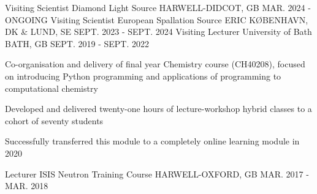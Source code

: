 \begin{cventries}
	\cventryn
	{Visiting Scientist}
	{Diamond Light Source}
	{HARWELL-DIDCOT, GB}
	{MAR. 2024 - ONGOING}
	\cventryn
	{Visiting Scientist}
	{European Spallation Source ERIC}
	{K\O BENHAVN, DK \& LUND, SE}
	{SEPT. 2023 - SEPT. 2024}
	\cventry
	{Visiting Lecturer}
	{University of Bath}
	{BATH, GB}
	{SEPT. 2019 - SEPT. 2022}
	{
		\begin{cvitems}
			\item {Co-organisation and delivery of final year Chemistry course (CH40208), focused on introducing Python programming and applications of programming to computational chemistry}
			\item {Developed and delivered twenty-one hours of lecture-workshop hybrid classes to a cohort of seventy students}
			\item {Successfully transferred this module to a completely online learning module in 2020}
		\end{cvitems}
	}
	\cventryn
	{Lecturer}
	{ISIS Neutron Training Course}
	{HARWELL-OXFORD, GB}
	{MAR. 2017 - MAR. 2018}
\end{cventries}
